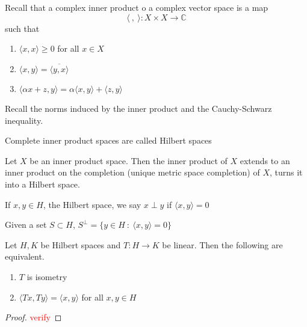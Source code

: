 
\chapter{}

\begin{definition}
  Recall that a complex inner product o a complex vector space is a
  map \[
    \langle \ , \  \rangle : X \times X \to \mathbb{C}
  \]
  such that
  \begin{enumerate}[label=(\arabic*)]
    \item $\langle x , x \rangle \ge 0$ for all $x \in X$
    \item $\langle  x , y \rangle  = \overline{\langle y , x \rangle }$
    \item $\langle \alpha x + z, y \rangle  = \alpha \langle x , y
      \rangle  + \langle z , y \rangle $
  \end{enumerate}
\end{definition}

Recall the norms induced by the inner product and the Cauchy-Schwarz inequality.

\begin{definition}
  Complete inner product spaces are called Hilbert spaces
\end{definition}

\begin{proposition}
  Let $X$ be an inner product space. Then the inner product of $X$
  extends to an inner product on the completion (unique metric space
  completion) of $X$, turns it into
  a Hilbert space.
\end{proposition}

\begin{definition}
  If $x, y \in H$, the Hilbert space, we say $x \perp y$ if $ \langle
  x , y \rangle  = 0$
\end{definition}

\begin{definition}
  Given a set $S \subset H$, $S^\perp = \{ y \in H  \ : \  \langle x
  , y \rangle  = 0 \}$
\end{definition}

\begin{proposition}
  Let $H, K$ be Hilbert spaces and $T: H \to K$ be linear. Then the
  following are equivalent.
  \begin{enumerate}[label=(\arabic*)]
    \item $T$ is isometry
    \item $\langle  Tx , Ty \rangle = \langle x , y \rangle $ for all
      $x, y \in H$
  \end{enumerate}
\end{proposition}
\begin{proof}
  \textcolor{red}{verify}
\end{proof}

